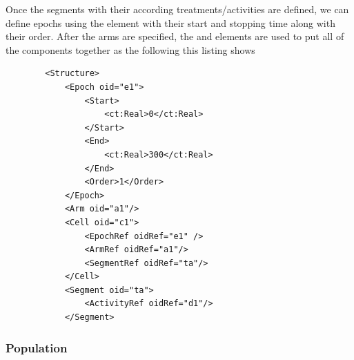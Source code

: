 


Once the segments with their according treatments/activities are defined, 
we can define epochs using the element  with their start and 
stopping time along with their order. After the arms are specified, the 
 and  elements are used to put all of the 
components together as the following this listing shows 
\lstset{language=XML}
\begin{lstlisting}
        <Structure>
            <Epoch oid="e1">
                <Start>
                    <ct:Real>0</ct:Real>
                </Start>
                <End>
                    <ct:Real>300</ct:Real>
                </End>
                <Order>1</Order>
            </Epoch>
            <Arm oid="a1"/>
            <Cell oid="c1">
                <EpochRef oidRef="e1" />
                <ArmRef oidRef="a1"/>
                <SegmentRef oidRef="ta"/>
            </Cell>
            <Segment oid="ta">
                <ActivityRef oidRef="d1"/>
            </Segment>
\end{lstlisting}

\subsubsection{Population}

